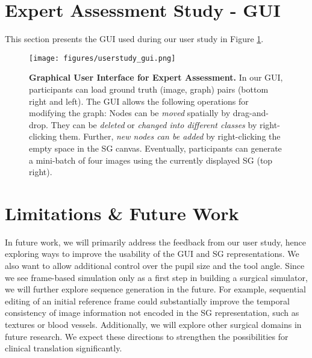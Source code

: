 \section{Expert Assessment Study - GUI}
\label{sec:app_gui}
This section presents the GUI used during our user study in Figure \ref{fig:gui}.
\begin{figure}[htbp]
    \centering
    \texttt{[image: figures/userstudy\_gui.png]}
    \caption{\textbf{Graphical User Interface for Expert Assessment.} In our GUI, participants can load ground truth (image, graph) pairs (bottom right and left). The GUI allows the following operations for modifying the graph: Nodes can be \emph{moved} spatially by drag-and-drop. They can be \emph{deleted} or \emph{changed into different classes} by right-clicking them. Further, \emph{new nodes can be added} by right-clicking the empty space in the SG canvas. Eventually, participants can generate a mini-batch of four images using the currently displayed SG (top right).}
    \label{fig:gui}
\end{figure}

\section{Limitations \& Future Work}
\label{sec:app_lim}
In future work, we will primarily address the feedback from our user study, hence exploring ways to improve the usability of the GUI and SG representations. We also want to allow additional control over the pupil size and the tool angle. Since we see frame-based simulation only as a first step in building a surgical simulator, we will further explore sequence generation in the future. For example, sequential editing of an initial reference frame could substantially improve the temporal consistency of image information not encoded in the SG representation, such as textures or blood vessels. Additionally, we will explore other surgical domains in future research. We expect these directions to strengthen the possibilities for clinical translation significantly.